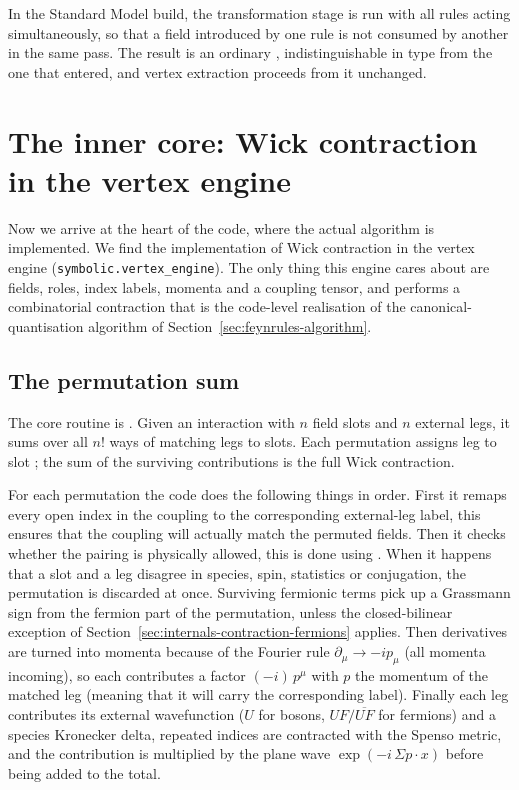In the Standard Model build, the transformation stage is run with all rules acting simultaneously, so that a field introduced by one rule is not consumed by another in the same pass. The result is an ordinary , indistinguishable in type from the one that entered, and vertex extraction proceeds from it unchanged.

\section{The inner core: Wick contraction in the vertex engine}
\label{sec:internals-contraction}

Now we arrive at the heart of the code, where the actual algorithm is implemented. We find the implementation of Wick contraction in
the vertex engine (\texttt{symbolic.vertex\_engine}). The only thing this engine cares about are fields, roles, index labels, momenta and a coupling tensor, and performs a combinatorial contraction that is the code-level realisation of the canonical-quantisation algorithm of Section~\ref{sec:feynrules-algorithm}.

\subsection{The permutation sum}

The core routine is . Given an interaction with $n$ field slots and $n$ external legs, it sums over all $n!$ ways of matching legs to slots. Each permutation  assigns leg  to slot ; the sum of the surviving contributions is the full Wick contraction.

For each permutation the code does the following things in order. First it remaps every open index in the coupling to the corresponding external-leg label, this ensures that the coupling will actually match the permuted fields. Then it checks whether the pairing is physically allowed, this is done using . When it happens that a slot and a leg disagree in species, spin, statistics or conjugation, the permutation is discarded at once. Surviving fermionic terms pick up a Grassmann sign from the fermion part of the permutation, unless the closed-bilinear exception of Section~\ref{sec:internals-contraction-fermions} applies. Then derivatives are turned into momenta because of the Fourier rule $\partial_\mu \to -i p_\mu$ (all momenta incoming), so each  contributes a factor $(-i)\,p^\mu$ with $p$ the momentum of the matched leg (meaning that it will carry the corresponding label). Finally each leg contributes its external wavefunction ($U$ for bosons, $UF/\overline{UF}$ for fermions) and a species Kronecker delta, repeated indices are contracted with the Spenso metric, and the contribution is multiplied by the plane wave $\exp(-i\,\Sigma p\!\cdot\!x)$ before being added to the total.

